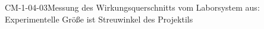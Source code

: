 
\begin{CONC}{CM-1-04-03}{Messung des Wirkungsquerschnitts vom Laborsystem aus: Experimentelle Größe ist Streuwinkel des Projektils}
\end{CONC}
